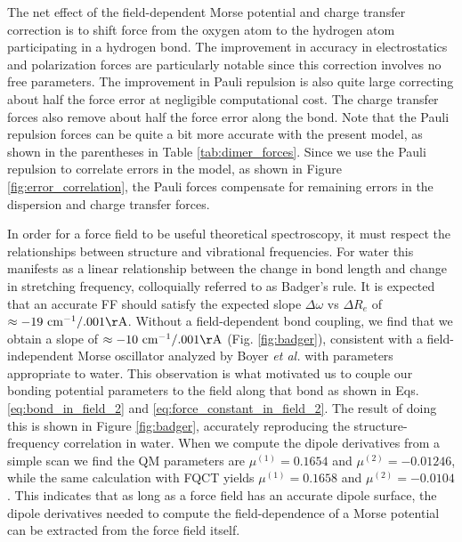 \documentclass[journal=jctcce,manuscript=article]{achemso}
\begin{document}
The net effect of the field-dependent Morse potential and charge transfer correction is to shift force from the oxygen atom to the hydrogen atom participating in a hydrogen bond. The improvement in accuracy in electrostatics and polarization forces are particularly notable since this correction involves no free parameters. The improvement in Pauli repulsion is also quite large correcting about half the force error at negligible computational cost. The charge transfer forces also remove about half the force error along the  bond. Note that the Pauli repulsion forces can be quite a bit more accurate with the present model, as shown in the parentheses in Table \ref{tab:dimer_forces}. Since we use the Pauli repulsion to correlate errors in the model, as shown in Figure \ref{fig:error_correlation}, the Pauli forces compensate for remaining errors in the dispersion and charge transfer forces.

In order for a force field to be useful theoretical spectroscopy, it must respect the relationships between structure and vibrational frequencies. For water this manifests as a linear relationship between the change in bond length and change in  stretching frequency\cite{boyer2019beyond}, colloquially referred to as Badger's rule.\cite{badger1934relation} It is expected that an accurate FF should satisfy the expected slope $\Delta\omega$ vs $\Delta R_e$ of $\approx -19\ \mathrm{cm^{-1}/.001\AA}$\cite{boyer2019beyond}. Without a field-dependent bond coupling, we find that  we obtain a slope of $\approx -10\ \mathrm{cm^{-1}/.001\AA}$ (Fig. \ref{fig:badger}), consistent with a field-independent Morse oscillator analyzed by Boyer \textit{et al.} with parameters appropriate to water.\cite{boyer2019beyond} This observation is what motivated us to couple our bonding potential parameters to the field along that bond as shown in Eqs. \ref{eq:bond_in_field_2} and \ref{eq:force_constant_in_field_2}. The result of doing this is shown in Figure \ref{fig:badger}, accurately reproducing the structure-frequency correlation in water. When we compute the dipole derivatives from a simple  scan we find the QM parameters are $\mu^{(1)}=0.1654$ and $\mu^{(2)}=-0.01246$, while the same calculation with FQCT yields $\mu^{(1)}=0.1658$ and $\mu^{(2)}=-0.0104$. This indicates that as long as a force field has an accurate dipole surface, the dipole derivatives needed to compute the field-dependence of a Morse potential can be extracted from the force field itself.
\end{document}
